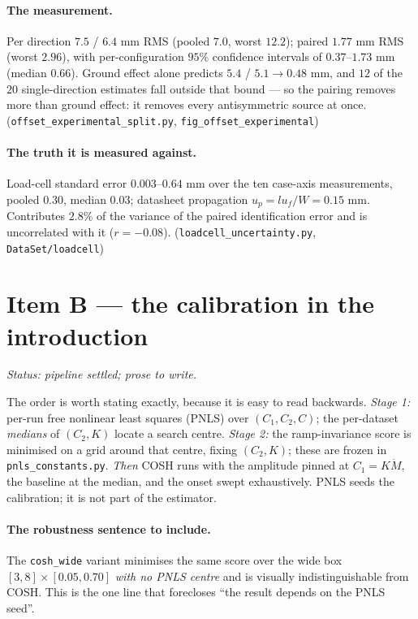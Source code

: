 \documentclass[10pt]{article}
\newcommand{\scr}[1]{\texttt{\small #1}}
\begin{document}
\paragraph{The measurement.} Per direction $7.5$ / $6.4$ mm RMS
(pooled $7.0$, worst $12.2$); paired $1.77$ mm RMS (worst $2.96$),
with per-configuration $95\%$ confidence intervals of $0.37$--$1.73$
mm (median $0.66$). Ground effect alone predicts $5.4$ / $5.1 \to
0.48$ mm, and $12$ of the $20$ single-direction estimates fall outside
that bound --- so the pairing removes more than ground effect: it
removes every antisymmetric source at once.
\hfill (\scr{offset\_experimental\_split.py}, \scr{fig\_offset\_experimental})

\paragraph{The truth it is measured against.} Load-cell standard error
$0.003$--$0.64$ mm over the ten case-axis measurements, pooled
$0.30$, median $0.03$; datasheet propagation $u_p = l u_f/W = 0.15$ mm.
Contributes $2.8\%$ of the variance of the paired identification error
and is uncorrelated with it ($r = -0.08$).
\hfill (\scr{loadcell\_uncertainty.py}, \scr{DataSet/loadcell})

\section{Item B --- the calibration in the introduction}

\emph{Status: pipeline settled; prose to write.}

The order is worth stating exactly, because it is easy to read
backwards. \emph{Stage 1:} per-run free nonlinear least squares
(PNLS) over $(C_1,C_2,C)$; the per-dataset \emph{medians} of
$(C_2,K)$ locate a search centre. \emph{Stage 2:} the
ramp-invariance score is minimised on a grid around that centre,
fixing $(C_2,K)$; these are frozen in \scr{pnls\_constants.py}.
\emph{Then} COSH runs with the amplitude pinned at $C_1 = K\dot M$,
the baseline at the median, and the onset swept exhaustively. PNLS
seeds the calibration; it is not part of the estimator.

\paragraph{The robustness sentence to include.} The \scr{cosh\_wide}
variant minimises the same score over the wide box
$[3,8]\times[0.05,0.70]$ \emph{with no PNLS centre} and is visually
indistinguishable from COSH. This is the one line that forecloses
``the result depends on the PNLS seed''.
\end{document}
